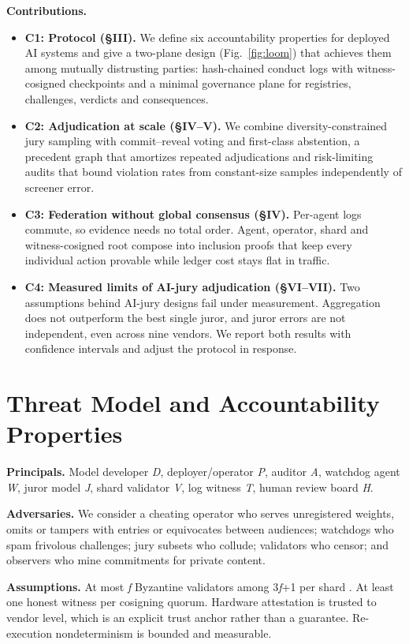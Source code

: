 \documentclass[conference]{IEEEtran}
\begin{document}
\textbf{Contributions.}
\begin{itemize}
\item \textbf{C1: Protocol (\S{}III).} We define six accountability properties for deployed AI systems and give a two-plane design (Fig.~\ref{fig:loom}) that achieves them among mutually distrusting parties: hash-chained conduct logs with witness-cosigned checkpoints and a minimal governance plane for registries, challenges, verdicts and consequences.
\item \textbf{C2: Adjudication at scale (\S{}IV--V).} We combine diversity-constrained jury sampling with commit--reveal voting and first-class abstention, a precedent graph that amortizes repeated adjudications and risk-limiting audits that bound violation rates from constant-size samples independently of screener error.
\item \textbf{C3: Federation without global consensus (\S{}IV).} Per-agent logs commute, so evidence needs no total order. Agent, operator, shard and witness-cosigned root compose into inclusion proofs that keep every individual action provable while ledger cost stays flat in traffic.
\item \textbf{C4: Measured limits of AI-jury adjudication (\S{}VI--VII).} Two assumptions behind AI-jury designs fail under measurement. Aggregation does not outperform the best single juror, and juror errors are not independent, even across nine vendors. We report both results with confidence intervals and adjust the protocol in response.
\end{itemize}

\section{Threat Model and Accountability Properties}

\textbf{Principals.} Model developer \textit{D}, deployer/operator \textit{P}, auditor \textit{A}, watchdog agent \textit{W}, juror model \textit{J}, shard validator \textit{V}, log witness \textit{T}, human review board \textit{H}.

\textbf{Adversaries.} We consider a cheating operator who serves unregistered weights, omits or tampers with entries or equivocates between audiences; watchdogs who spam frivolous challenges; jury subsets who collude; validators who censor; and observers who mine commitments for private content.

\textbf{Assumptions.} At most \textit{f} Byzantine validators among 3\textit{f}+1 per shard \cite{r7}. At least one honest witness per cosigning quorum. Hardware attestation is trusted to vendor level, which is an explicit trust anchor rather than a guarantee. Re-execution nondeterminism is bounded and measurable.
\end{document}
